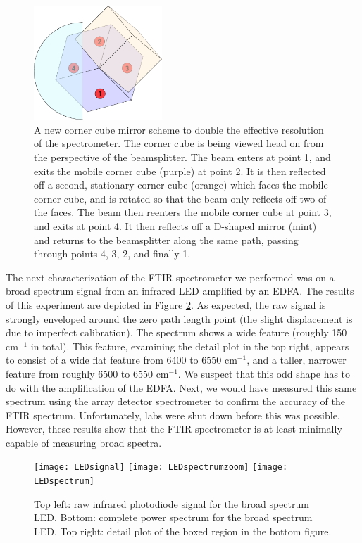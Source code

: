 \documentclass[12pt]{puthesis}
\newcommand{\wn}[1][ ]{cm$^{-1}$#1}
\begin{document}
\begin{figure}[t]
  \centering
  \includegraphics[width=0.43\textwidth]{NewMirrorScheme}
  \caption{A new corner cube mirror scheme to double the effective resolution of the spectrometer. The corner cube is being viewed head on from the perspective of the beamsplitter. The beam enters at point 1, and exits the mobile corner cube (purple) at point 2. It is then reflected off a second, stationary corner cube (orange) which faces the mobile corner cube, and is rotated so that the beam only reflects off two of the faces. The beam then reenters the mobile corner cube at point 3, and exits at point 4. It then reflects off a D-shaped mirror (mint) and returns to the beamsplitter along the same path, passing through points 4, 3, 2, and finally 1.}
  \label{fig:newmirrorscheme}
\end{figure}

The next characterization of the FTIR spectrometer we performed was on a broad spectrum signal from an infrared LED amplified by an EDFA. The results of this experiment are depicted in Figure \ref{fig:LED}. As expected, the raw signal is strongly enveloped around the zero path length point (the slight displacement is due to imperfect calibration). The spectrum shows a wide feature (roughly 150 \wn in total). This feature, examining the detail plot in the top right, appears to consist of a wide flat feature from 6400 to 6550 \wn[], and a taller, narrower feature from roughly 6500 to 6550 \wn[.] We suspect that this odd shape has to do with the amplification of the EDFA. Next, we would have measured this same spectrum using the array detector spectrometer to confirm the accuracy of the FTIR spectrum. Unfortunately, labs were shut down before this was possible. However, these results show that the FTIR spectrometer is at least minimally capable of measuring broad spectra. 

\begin{figure}[t]
  \centering
  \texttt{[image: LEDsignal]}
  \texttt{[image: LEDspectrumzoom]}
  \texttt{[image: LEDspectrum]}
  \caption{Top left: raw infrared photodiode signal for the broad spectrum LED. Bottom: complete power spectrum for the broad spectrum LED. Top right: detail plot of the boxed region in the bottom figure.}
  \label{fig:LED}
\end{figure}
\end{document}
